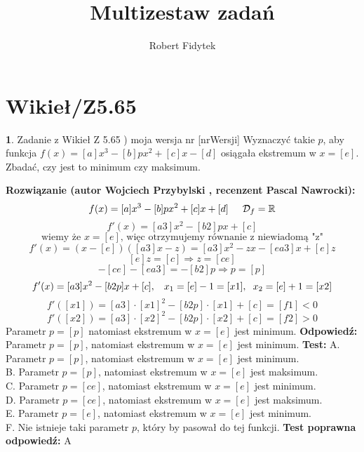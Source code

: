 \documentclass[12pt, a4paper]{article}
\title{Multizestaw zadań}
\author{Robert Fidytek}
\date{}
\theoremstyle{definition} %
\newtheorem{zad}{}
\newcommand{\kategoria}[1]{\section{#1}} %
\newcommand{\zadStart}[1]{\begin{zad}#1\newline} %
\newcommand{\zadStop}{\end{zad}}   %
\newcommand{\rozwStart}[2]{\noindent \textbf{Rozwiązanie (autor #1 , recenzent #2): }\newline} %
\newcommand{\rozwStop}{\newline}                                            %
\newcommand{\odpStart}{\noindent \textbf{Odpowiedź:}\newline}    %
\newcommand{\odpStop}{\newline}                                             %
\newcommand{\testStart}{\noindent \textbf{Test:}\newline} %
\newcommand{\testStop}{\newline} %
\newcommand{\kluczStart}{\noindent \textbf{Test poprawna odpowiedź:}\newline} %
\newcommand{\kluczStop}{\newline} %
\begin{document}
\maketitle


\kategoria{Wikieł/Z5.65}
\zadStart{Zadanie z Wikieł Z 5.65 ) moja wersja nr [nrWersji]}
Wyznaczyć takie $p$, aby funkcja $f(x)=[a]x^{3}-[b]px^{2}+[c]x-[d]$ osiągała ekstremum w $x=[e]$. Zbadać, czy jest to minimum czy maksimum.
\zadStop
\rozwStart{Wojciech Przybylski}{Pascal Nawrocki}
$$ f(x)=[a]x^{3}-[b]px^{2}+[c]x+[d]\hspace{5mm} \mathcal{D}_{f}=\mathbb{R}$$
$$ f'(x)=[a3]x^{2}-[b2]px+[c]$$
$$\mbox{ wiemy że } x=[e] \mbox{, więc otrzymujemy równanie z niewiadomą "z" }$$
$$f'(x)=(x-[e])([a3]x-z)=[a3]x^{2}-zx-[ea3]x+[e]z$$
$$[e]z=[c]\Rightarrow z=[ce]$$
$$-[ce]-[ea3]=-[b2]p \Rightarrow p=[p]$$
$$f'(x)=[a3]x^{2}-[b2p]x+[c],\hspace{3mm}x_{1}=[e]-1=[x1],\hspace{2mm} x_{2}=[e]+1=[x2]$$
$$f'([x1])=[a3]\cdot[x1]^{2}-[b2p]\cdot[x1]+[c]=[f1]<0$$
$$f'([x2])=[a3]\cdot[x2]^{2}-[b2p]\cdot[x2]+[c]=[f2]>0$$
Parametr $p=[p]$ natomiast ekstremum w $x=[e]$ jest minimum.
\rozwStop
\odpStart
Parametr $p=[p]$, natomiast ekstremum w $x=[e]$ jest minimum.
\odpStop
\testStart
A. Parametr $p=[p]$, natomiast ekstremum w $x=[e]$ jest minimum.\\
B. Parametr $p=[p]$, natomiast ekstremum w $x=[e]$ jest maksimum.\\
C. Parametr $p=[ce]$, natomiast ekstremum w $x=[e]$ jest minimum.\\
D. Parametr $p=[ce]$, natomiast ekstremum w $x=[e]$ jest maksimum.\\
E. Parametr $p=[e]$, natomiast ekstremum w $x=[e]$ jest minimum.\\
F. Nie istnieje taki parametr $p$, który by pasował do tej funkcji.
\testStop
\kluczStart
A
\kluczStop
\end{document}
